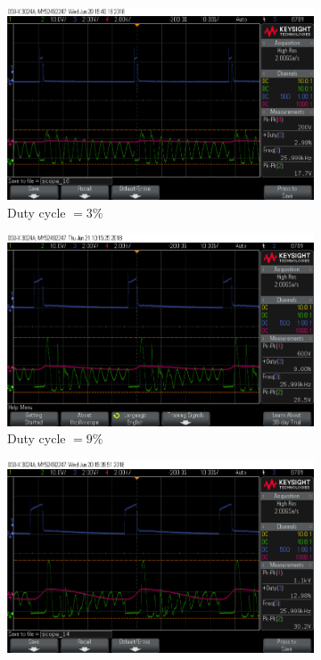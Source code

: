 \documentclass[11pt]{article}
\begin{document}
\begin{figure}[h!]
\centering
\begin{subfigure}{0.49\textwidth}
\centering
\includegraphics[width = \textwidth]{craft_sc_21}
\caption{Duty cycle $=3\%$}
\label{fig:craft_sc_21}
\end{subfigure}
\begin{subfigure}{0.49\textwidth}
\centering
\includegraphics[width = \textwidth]{craft_sc_22}
\caption{Duty cycle $=9\%$}
\label{fig:craft_sc_22}
\end{subfigure}
\begin{subfigure}{0.49\textwidth}
\centering
\includegraphics[width = \textwidth]{craft_sc_23}

\end{subfigure}
\end{figure}
\end{document}
